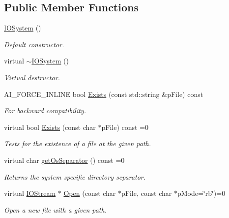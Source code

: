 \subsection*{Public Member Functions}
\begin{DoxyCompactItemize}
\item 
\hyperlink{class_assimp_1_1_i_o_system_af8ba1ee2dc0686da8fc9e3dad49af801}{I\+O\+System} ()
\begin{DoxyCompactList}\small\item\em Default constructor. \end{DoxyCompactList}\item 
virtual \hyperlink{class_assimp_1_1_i_o_system_a617417f1c5125770606fea3b41068b36}{$\sim$\+I\+O\+System} ()
\begin{DoxyCompactList}\small\item\em Virtual destructor. \end{DoxyCompactList}\item 
A\+I\+\_\+\+F\+O\+R\+C\+E\+\_\+\+I\+N\+L\+I\+NE bool \hyperlink{class_assimp_1_1_i_o_system_a7ae6cfaea4957408967463bfc3b84b27}{Exists} (const std\+::string \&p\+File) const 
\begin{DoxyCompactList}\small\item\em For backward compatibility. \end{DoxyCompactList}\item 
virtual bool \hyperlink{class_assimp_1_1_i_o_system_a940f6ced652b44f9ffd28823ce03e426}{Exists} (const char $\ast$p\+File) const  =0
\begin{DoxyCompactList}\small\item\em Tests for the existence of a file at the given path. \end{DoxyCompactList}\item 
virtual char \hyperlink{class_assimp_1_1_i_o_system_a18e203246509bf5f6b6ae081d9ecbc9b}{get\+Os\+Separator} () const  =0
\begin{DoxyCompactList}\small\item\em Returns the system specific directory separator. \end{DoxyCompactList}\item 
virtual \hyperlink{class_assimp_1_1_i_o_stream}{I\+O\+Stream} $\ast$ \hyperlink{class_assimp_1_1_i_o_system_ac512ece3b0701de5682553007a4c0816}{Open} (const char $\ast$p\+File, const char $\ast$p\+Mode=\char`\"{}rb\char`\"{})=0
\begin{DoxyCompactList}\small\item\em Open a new file with a given path. \end{DoxyCompactList}\item 

\end{DoxyCompactItemize}
